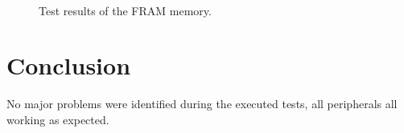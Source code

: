 \begin{figure}[!htb]
    \begin{center}
        ~
        \caption{Test results of the FRAM memory.}
        \label{fig:v07-fram-test}
    \end{center}
\end{figure}

\section{Conclusion}

No major problems were identified during the executed tests, all peripherals all working as expected.